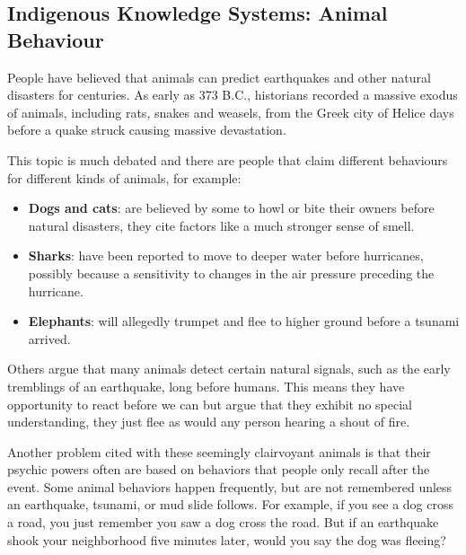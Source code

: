             \subsection{ Indigenous Knowledge Systems: Animal Behaviour}
            \nopagebreak
            \label{m38779*id1164126080746}People have believed that animals can predict earthquakes and other natural disasters for centuries. As early as 373 B.C., historians recorded a massive exodus of animals, including rats, snakes and weasels, from the Greek city of Helice days before a quake struck causing massive devastation.\par 
      \label{m38779*id1164126439136}This topic is much debated and there are people that claim different behaviours for different kinds of animals, for example:\par 
      \label{m38779*id1164132827593}\begin{itemize}[noitemsep]
            \item \textbf{Dogs and cats}: are believed by some to howl or bite their owners before natural disasters, they cite factors like a much stronger sense of smell.\item \textbf{Sharks}: have been reported to move to deeper water before hurricanes, possibly because a sensitivity to changes in the air pressure preceding the hurricane.\item \textbf{Elephants}: will allegedly trumpet and flee to higher ground before a tsunami arrived.\end{itemize}
      \label{m38779*id1164121170251}Others argue that many animals detect certain natural signals, such as the early tremblings of an earthquake, long before humans. This means they have opportunity to react before we can but argue that they exhibit no special understanding, they just flee as would any person hearing a shout of fire.\par 
      \label{m38779*id6489198}Another problem cited with these seemingly clairvoyant animals is that their psychic powers often are based on behaviors that people only recall after the event. Some animal behaviors happen frequently, but are not remembered unless an earthquake, tsunami, or mud slide follows. For example, if you see a dog cross a road, you just remember you saw a dog cross the road. But if an earthquake shook your neighborhood five minutes later, would you say the dog was fleeing? \par 
      \label{m38779*id1553831}
